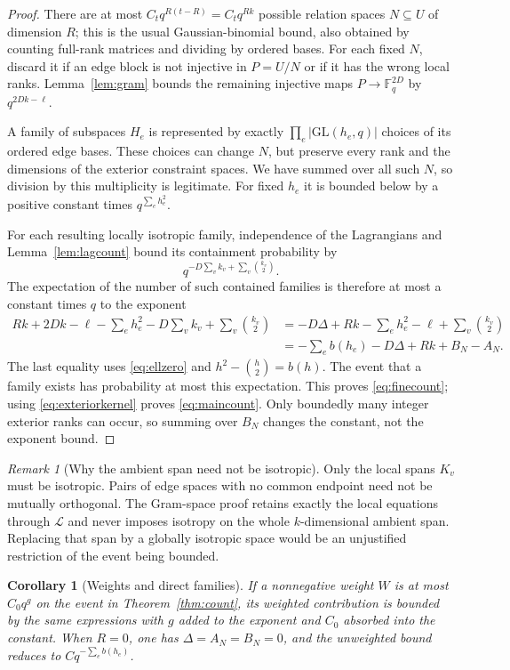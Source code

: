 \documentclass[11pt]{article}
\newtheorem{corollary}[theorem]{Corollary}
\theoremstyle{definition}
\theoremstyle{remark}
\newtheorem{remark}[theorem]{Remark}
\newcommand{\Fq}{\mathbb F_q}
\newcommand{\1}{\mathbf 1}
\begin{document}
\begin{proof}
There are at most $C_t q^{R(t-R)}=C_tq^{Rk}$ possible relation spaces
$N\subseteq U$ of dimension $R$; this is the usual Gaussian-binomial bound,
also obtained by counting full-rank matrices and dividing by ordered bases.
For each fixed $N$, discard it if an edge block is not injective in $P=U/N$
or if it has the wrong local ranks. Lemma~\ref{lem:gram} bounds the remaining
injective maps $P\to\Fq^{2D}$ by $q^{2Dk-\ell}$.

A family of subspaces $H_e$ is represented by exactly
$\prod_e|\mathrm{GL}(h_e,q)|$ choices of its ordered edge bases. These choices
can change $N$, but preserve every rank and the dimensions of the exterior
constraint spaces. We have summed over all such $N$, so division by this
multiplicity is legitimate. For fixed $h_e$ it is bounded below by a positive
constant times $q^{\sum_eh_e^2}$.

For each resulting locally isotropic family, independence of the Lagrangians
and Lemma~\ref{lem:lagcount} bound its containment probability by
\[
 q^{-D\sum_v k_v+\sum_v\binom{k_v}{2}}.
\]
The expectation of the number of such contained families is therefore at most
a constant times $q$ to the exponent
\begin{align*}
 Rk+2Dk-\ell-\sum_eh_e^2
 -D\sum_v k_v+\sum_v\binom{k_v}{2}
 &= -D\Delta+Rk-\sum_eh_e^2-\ell
       +\sum_v\binom{k_v}{2}\\
 &= -\sum_e b(h_e)-D\Delta+Rk+B_N-A_N.
\end{align*}
The last equality uses \eqref{eq:ellzero} and
$h^2-\binom h2=b(h)$. The event that a family exists has probability at most
this expectation. This proves \eqref{eq:finecount}; using
\eqref{eq:exteriorkernel} proves \eqref{eq:maincount}.
Only boundedly many integer exterior ranks can occur, so summing over $B_N$
changes the constant, not the exponent bound.
\end{proof}

\begin{remark}[Why the ambient span need not be isotropic]
Only the local spans $K_v$ must be isotropic. Pairs of edge spaces with no common
endpoint need not be mutually orthogonal. The Gram-space proof retains exactly
the local equations through $\mathcal L$ and never imposes isotropy on the
whole $k$-dimensional ambient span. Replacing that span by a globally isotropic
space would be an unjustified restriction of the event being bounded.
\end{remark}

\begin{corollary}[Weights and direct families]
\label{cor:weighted}
If a nonnegative weight $W$ is at most $C_0q^g$ on the event in
Theorem~\ref{thm:count}, its weighted contribution is bounded by the same
expressions with $g$ added to the exponent and $C_0$ absorbed into the constant.
When $R=0$, one has $\Delta=A_N=B_N=0$, and the unweighted bound reduces to
$Cq^{-\sum_e b(h_e)}$.
\end{corollary}
\end{document}
